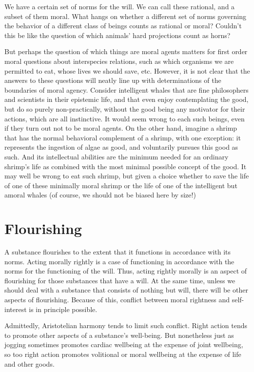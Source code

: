 We have a certain set of norms for the will. We can call these rational, and a subset of them moral. What hangs on whether a different
set of norms governing the behavior of a different class of beings counts as rational or moral? Couldn't this be like the question of
which animals' hard projections count as horns? 

But perhaps the question of which things are moral agents matters for first order moral questions about interspecies relations, such 
as which organisms we are permitted to eat, whose lives we should save, etc. However, it is not clear that the answers to these questions will neatly line up with
determinations of the boundaries of moral agency. Consider intelligent whales that are fine philosophers and scientists in their epistemic life, 
and that even enjoy contemplating the good, but do so purely non-practically, without the good being any motivator for their 
actions, which are all instinctive. It would seem wrong to each such beings, even if they turn out not to be moral agents.
On the other hand, imagine a shrimp that has the normal behavioral complement of a shrimp, with one exception: it represents
the ingestion of algae as good, and voluntarily pursues this good as such. And its intellectual abilities are the minimum needed
for an ordinary shrimp's life as combined with the most minimal possible concept of the good. It may well be wrong to eat such shrimp,
but given a choice whether to save the life of one of these minimally moral shrimp or the life of one of the intelligent but amoral 
whales (of course, we should not be biased here by size!)


\section{Flourishing}
A substance flourishes to the extent that it functions in accordance with its norms.  Acting morally rightly is
a case of functioning in accordance with the norms for the functioning of the will. Thus, acting rightly morally is an aspect of flourishing
for those substances that have a will. At the same time, unless we should deal with a substance that consists of nothing but will, there will be other
aspects of flourishing. Because of this, conflict between moral rightness and self-interest is in principle possible.

Admittedly, Aristotelian harmony tends to limit such conflict. Right action tends to promote other aspects of a substance's well-being. But nonetheless
just as jogging sometimes promotes cardiac wellbeing at the expense of joint wellbeing, so too right action promotes volitional or moral wellbeing at the expense
of life and other goods.

